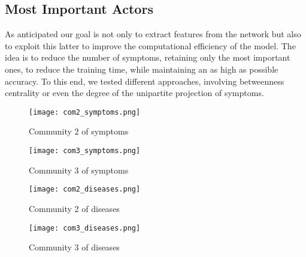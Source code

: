 
\subsection{Most Important Actors}

As anticipated our goal is not only to extract features from the network but also to exploit this latter to improve the 
computational efficiency of the model. The idea is to reduce the number of symptoms, retaining only the most important
ones, to reduce the training time, while maintaining an as high as possible accuracy. To this end, we tested different
approaches, involving betweenness centrality or even the degree of the unipartite projection of symptoms.






\begin{figure}[H]
    \centering
    \texttt{[image: com2\_symptoms.png]}
    \caption{Community 2 of symptoms}
    \label{fig:com2_symptoms}
\end{figure}

\begin{figure}[H]
    \centering
    \texttt{[image: com3\_symptoms.png]}
    \caption{Community 3 of symptoms}
    \label{fig:com3_symptoms}
\end{figure}



\begin{figure}[H]
    \centering
    \texttt{[image: com2\_diseases.png]}
    \caption{Community 2 of diseases}
    \label{fig:com2_diseases}
\end{figure}

\begin{figure}[H]
    \centering
    \texttt{[image: com3\_diseases.png]}
    \caption{Community 3 of diseases}
    \label{fig:com3_diseases}
\end{figure}